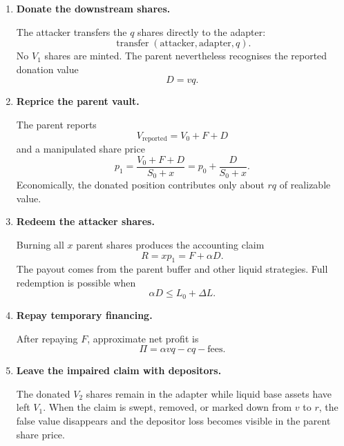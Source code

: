 \documentclass[11pt]{article}
\begin{document}
\begin{enumerate}
    \item \textbf{Donate the downstream shares.}

    The attacker transfers the $q$ shares directly to the adapter:
    \begin{equation}
        \operatorname{transfer}(\text{attacker},\text{adapter},q).
    \end{equation}
    No $V_1$ shares are minted.  The parent nevertheless recognises the reported donation value
    \begin{equation}
        D=vq.
    \end{equation}

    \item \textbf{Reprice the parent vault.}

    The parent reports
    \begin{equation}
        V_{\mathrm{reported}}=V_0+F+D
    \end{equation}
    and a manipulated share price
    \begin{equation}
        p_1=\frac{V_0+F+D}{S_0+x}
           =p_0+\frac{D}{S_0+x}.
    \end{equation}
    Economically, the donated position contributes only about $rq$ of realizable value.

    \item \textbf{Redeem the attacker shares.}

    Burning all $x$ parent shares produces the accounting claim
    \begin{equation}
        R=xp_1=F+\alpha D.
    \end{equation}
    The payout comes from the parent buffer and other liquid strategies.  Full redemption is possible when
    \begin{equation}
        \alpha D\leq L_0+\Delta L.
    \end{equation}

    \item \textbf{Repay temporary financing.}

    After repaying $F$, approximate net profit is
    \begin{equation}
        \Pi=\alpha vq-cq-\text{fees}.
    \end{equation}

    \item \textbf{Leave the impaired claim with depositors.}

    The donated $V_2$ shares remain in the adapter while liquid base assets have left $V_1$.  When the claim is swept, removed, or marked down from $v$ to $r$, the false value disappears and the depositor loss becomes visible in the parent share price.
\end{enumerate}
\end{document}
